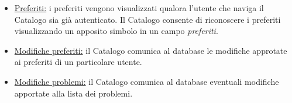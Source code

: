\documentclass[11pt, a4paper]{article}
\theoremstyle{definition} %
\begin{document}
\begin{description}
\begin{itemize}
        \item \underline{Preferiti:} i preferiti vengono visualizzati qualora
        l'utente che naviga il Catalogo sia già autenticato. Il Catalogo consente
        di riconoscere i preferiti visualizzando un apposito simbolo in un campo
        \textit{preferiti}.

        \item \underline{Modifiche preferiti:} il Catalogo comunica al database le
        modifiche approtate ai preferiti di un particolare utente.

        \item \underline{Modifiche problemi:} il Catalogo comunica al database eventuali
        modifiche apportate alla lista dei problemi.
    \end{itemize}
\end{description}

%
%
%
%
%
\end{document}
